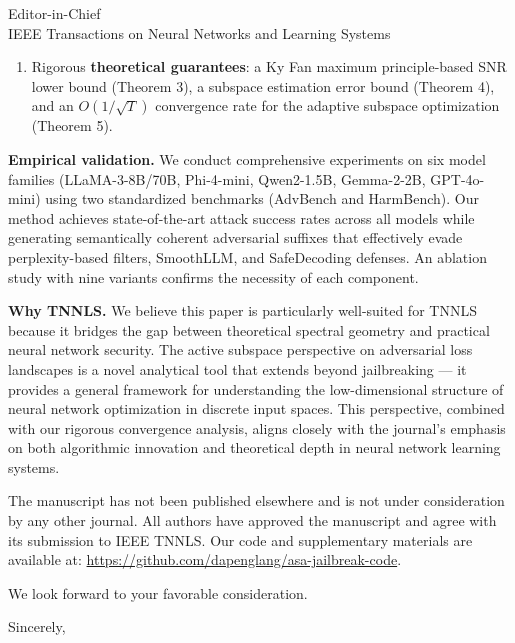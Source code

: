 \documentclass[11pt]{letter}
\begin{document}
\begin{letter}{Editor-in-Chief\\
IEEE Transactions on Neural Networks and Learning Systems}
\begin{enumerate}
  \item Rigorous \textbf{theoretical guarantees}: a Ky Fan maximum principle-based SNR lower bound (Theorem 3), a subspace estimation error bound (Theorem 4), and an $O(1/\sqrt{T})$ convergence rate for the adaptive subspace optimization (Theorem 5).
\end{enumerate}

\textbf{Empirical validation.} We conduct comprehensive experiments on six model families (LLaMA-3-8B/70B, Phi-4-mini, Qwen2-1.5B, Gemma-2-2B, GPT-4o-mini) using two standardized benchmarks (AdvBench and HarmBench). Our method achieves state-of-the-art attack success rates across all models while generating semantically coherent adversarial suffixes that effectively evade perplexity-based filters, SmoothLLM, and SafeDecoding defenses. An ablation study with nine variants confirms the necessity of each component.

\textbf{Why TNNLS.} We believe this paper is particularly well-suited for TNNLS because it bridges the gap between theoretical spectral geometry and practical neural network security. The active subspace perspective on adversarial loss landscapes is a novel analytical tool that extends beyond jailbreaking --- it provides a general framework for understanding the low-dimensional structure of neural network optimization in discrete input spaces. This perspective, combined with our rigorous convergence analysis, aligns closely with the journal's emphasis on both algorithmic innovation and theoretical depth in neural network learning systems.

The manuscript has not been published elsewhere and is not under consideration by any other journal. All authors have approved the manuscript and agree with its submission to IEEE TNNLS. Our code and supplementary materials are available at: \url{https://github.com/dapenglang/asa-jailbreak-code}.

We look forward to your favorable consideration.

\closing{Sincerely,}

\end{letter}
\end{document}
